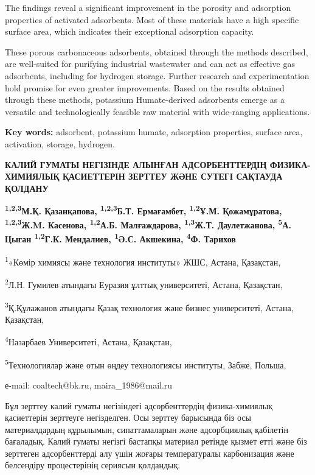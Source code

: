 The findings reveal a significant improvement in the porosity and
adsorption properties of activated adsorbents. Most of these materials
have a high specific surface area, which indicates their exceptional
adsorption capacity.

These porous carbonaceous adsorbents, obtained through the methods
described, are well-suited for purifying industrial wastewater and can
act as effective gas adsorbents, including for hydrogen storage. Further
research and experimentation hold promise for even greater improvements.
Based on the results obtained through these methods, potassium
Humate-derived adsorbents emerge as a versatile and technologically
feasible raw material with wide-ranging applications.

{\bfseries Key words:} adsorbent, potassium humate, adsorption properties,
surface area, activation, storage, hydrogen.

\begin{articleheader}
{\bfseries КАЛИЙ ГУМАТЫ НЕГІЗІНДЕ АЛЫНҒАН АДСОРБЕНТТЕРДІҢ ФИЗИКА-ХИМИЯЛЫҚ ҚАСИЕТТЕРІН ЗЕРТТЕУ ЖӘНЕ СУТЕГІ САҚТАУДА ҚОЛДАНУ}

{\bfseries
\textsuperscript{1,2,3}М.Қ. Қазанқапова\textsuperscript{\envelope },
\textsuperscript{1,2,3}Б.Т. Ермағамбет,
\textsuperscript{1,2}Ұ.М. Қожамұратова,
\textsuperscript{1,2,3}Ж.M. Касенова,
\textsuperscript{1,2}А.Б. Малғаждарова,
\textsuperscript{1,3}Ж.Т. Даулетжанова,
\textsuperscript{5}А. Цыган
\textsuperscript{1,2}Г.К. Мендалиев,
\textsuperscript{1}Ә.С. Акшекина,
\textsuperscript{4}Ф. Тарихов
}
\end{articleheader}

\begin{affiliation}
\textsuperscript{1}«Көмір химиясы және технология институты» ЖШС, Астана, Қазақстан,

\textsuperscript{2}Л.Н. Гумилев атындағы Еуразия ұлттық университеті, Астана, Қазақстан,

\textsuperscript{3}Қ.Құлажанов атындағы Қазақ технология және бизнес университеті, Астана, Қазақстан,

\textsuperscript{4}Назарбаев Университеті, Астана, Қазақстан,

\textsuperscript{5}Технологиялар және отын өңдеу технологиясы институты, Забже, Польша,

е-mail: coaltech@bk.ru, maira\_1986@mail.ru
\end{affiliation}

Бұл зерттеу калий гуматы негізіндегі адсорбенттердің физика-химиялық
қасиеттерін зерттеуге негізделген. Осы зерттеу барысында біз осы
материалдардың құрылымын, сипаттамаларын және адсорбциялық қабілетін
бағаладық. Калий гуматы негізгі бастапқы материал ретінде қызмет етті
және біз зерттеген адсорбенттерді алу үшін жоғары температуралы
карбонизация және белсендіру процестерінің сериясын қолдандық.

